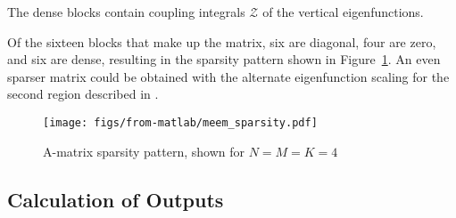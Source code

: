 \begin{appendices}
The dense blocks contain coupling integrals $\boldsymbol{\mathcal{Z}}$ of the vertical eigenfunctions.

Of the sixteen blocks that make up the matrix, six are diagonal, four are zero, and six are dense, resulting in the sparsity pattern shown in Figure~\ref{fig:sparsity}.
An even sparser matrix could be obtained with the alternate eigenfunction scaling for the second region described in \cite{chau_inertia_2012}. 
\begin{figure}
    \centering
    \texttt{[image: figs/from-matlab/meem\_sparsity.pdf]}
    \caption{A-matrix sparsity pattern, shown for $N=M=K=4$}
    \label{fig:sparsity}
\end{figure}


\subsection{Calculation of Outputs}


\end{appendices}
